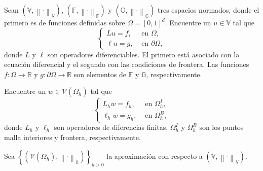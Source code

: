 Sean
\begin{math}
    \left(
    \mathbb{V},
    {\left\|\cdot\right\|}_{\mathbb{V}}
    \right)
\end{math},
\begin{math}
    \left(
    \mathbb{F},
    {\left\|\cdot\right\|}_{\mathbb{F}}
    \right)
\end{math}
y
\begin{math}
    \left(
    \mathbb{G},
    {\left\|\cdot\right\|}_{\mathbb{G}}
    \right)
\end{math}
tres espacios normados, donde el primero es de funciones definidas
sobre $\overline{\Omega}={\left[0,1\right]}^{d}$.
Encuentre un $u\in\mathbb{V}$ tal que
\begin{equation}\label{eq:boundary_value_problem}
    \begin{cases}
        Lu=f,     & \text{ en }\Omega,         \\
        \ell u=g, & \text{ en }\partial\Omega,
    \end{cases}
\end{equation}
donde $L$ y $\ell$ son operadores diferenciables.
El primero está asociado con la ecuación diferencial y el segundo con
las condiciones de frontera.
Las funciones $f\colon\Omega\to\mathbb{R}$ y
$g\colon\partial\Omega\to\mathbb{R}$
son elementos de $\mathbb{F}$ y $\mathbb{G}$, respectivamente.

Encuentre un $w\in\mathcal{V}\left(\overline{\Omega}_{h}\right)$ tal
que
\begin{equation}\label{eq:boundary_value_problem_finite}
    \begin{cases}
        L_{h}w=f_{h},    & \text{ en }\Omega^{I}_{h}, \\
        \ell_{h}w=g_{h}, & \text{ en }\Omega^{B}_{h},
    \end{cases}
\end{equation}
donde $L_{h}$ y $\ell_{h}$ son operadores de diferencias finitas,
\begin{math}
    \Omega^{I}_{h}
\end{math}
y
\begin{math}
    \Omega^{B}_{h}
\end{math}
son los puntos malla interiores y frontera, respectivamente.

Sea
\begin{math}
    \left\{
    \left(
    \mathcal{V}\left(\overline{\Omega}_{h}\right),
    \left\|\cdot\right\|_{h}
    \right)
    \right\}_{h>0}
\end{math}
la aproximación con respecto a
\begin{math}
    \left(
    \mathbb{V},
    {\left\|\cdot\right\|}_{\mathbb{V}}
    \right)
\end{math}.

